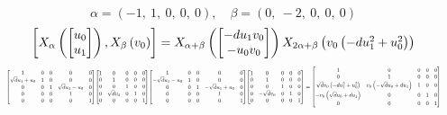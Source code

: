 \documentclass[11pt]{article}
\theoremstyle{definition}
\begin{document}
\[
\alpha = \left( -1, \  1, \  0, \  0, \  0\right), \quad \beta = \left( 0, \  -2, \  0, \  0, \  0\right)
\]
\[
\scaletoalign{\textwidth}{\left[ X_{\alpha}\left(\left[\begin{matrix}u_{0}\\u_{1}\end{matrix}\right]\right), X_{\beta}\left(v_{0}\right) \right] = X_{\alpha + \beta}\left(\left[\begin{matrix}- d u_{1} v_{0}\\- u_{0} v_{0}\end{matrix}\right]\right) X_{2\alpha + \beta}\left(v_{0} \left(- d u_{1}^{2} + u_{0}^{2}\right)\right)}
\]
\[
\scaletoalign{\textwidth}{{\left[\begin{matrix}1 & 0 & 0 & 0 & 0\\\sqrt{d} u_{1} + u_{0} & 1 & 0 & 0 & 0\\0 & 0 & 1 & \sqrt{d} u_{1} - u_{0} & 0\\0 & 0 & 0 & 1 & 0\\0 & 0 & 0 & 0 & 1\end{matrix}\right]} {\left[\begin{matrix}1 & 0 & 0 & 0 & 0\\0 & 1 & 0 & 0 & 0\\0 & 0 & 1 & 0 & 0\\0 & \sqrt{d} v_{0} & 0 & 1 & 0\\0 & 0 & 0 & 0 & 1\end{matrix}\right]} {\left[\begin{matrix}1 & 0 & 0 & 0 & 0\\- \sqrt{d} u_{1} - u_{0} & 1 & 0 & 0 & 0\\0 & 0 & 1 & - \sqrt{d} u_{1} + u_{0} & 0\\0 & 0 & 0 & 1 & 0\\0 & 0 & 0 & 0 & 1\end{matrix}\right]} {\left[\begin{matrix}1 & 0 & 0 & 0 & 0\\0 & 1 & 0 & 0 & 0\\0 & 0 & 1 & 0 & 0\\0 & - \sqrt{d} v_{0} & 0 & 1 & 0\\0 & 0 & 0 & 0 & 1\end{matrix}\right]} = {\left[\begin{matrix}1 & 0 & 0 & 0 & 0\\0 & 1 & 0 & 0 & 0\\\sqrt{d} v_{0} \left(- d u_{1}^{2} + u_{0}^{2}\right) & v_{0} \left(- \sqrt{d} u_{0} + d u_{1}\right) & 1 & 0 & 0\\- v_{0} \left(\sqrt{d} u_{0} + d u_{1}\right) & 0 & 0 & 1 & 0\\0 & 0 & 0 & 0 & 1\end{matrix}\right]}}
\]
\end{document}
